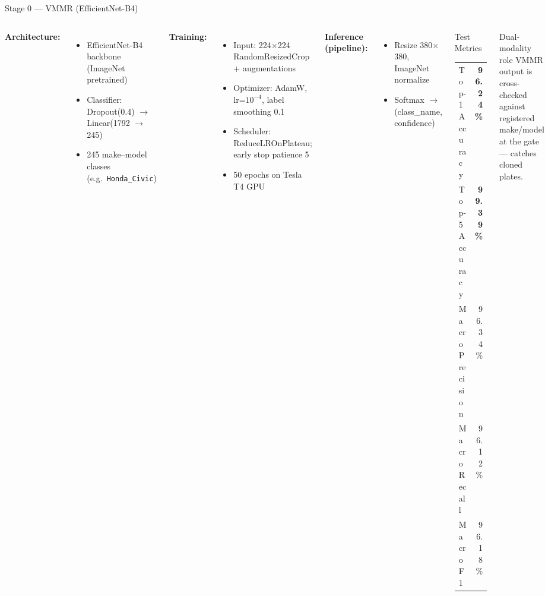 \documentclass[aspectratio=169,11pt]{beamer}
\begin{document}
\begin{frame}{Stage 0 --- VMMR (EfficientNet-B4)}
  \begin{columns}[T]
    \textbf{Architecture:}
    \begin{itemize}
      \item EfficientNet-B4 backbone (ImageNet pretrained)
      \item Classifier: Dropout(0.4) $\rightarrow$ Linear(1792 $\rightarrow$ 245)
      \item 245 make--model classes (e.g.\ \texttt{Honda\_Civic})
    \end{itemize}
    \textbf{Training:}
    \begin{itemize}
      \item Input: 224$\times$224 RandomResizedCrop + augmentations
      \item Optimizer: AdamW, lr=$10^{-4}$, label smoothing 0.1
      \item Scheduler: ReduceLROnPlateau; early stop patience 5
      \item 50 epochs on Tesla T4 GPU
    \end{itemize}
    \textbf{Inference (pipeline):}
    \begin{itemize}
      \item Resize 380$\times$380, ImageNet normalize
      \item Softmax $\rightarrow$ (class\_name, confidence)
    \end{itemize}
    \begin{block}{Test Metrics}
      \begin{tabular}{@{}lr@{}}
        Top-1 Accuracy & \textbf{96.24\%} \\
        Top-5 Accuracy & \textbf{99.39\%} \\
        Macro Precision & 96.34\% \\
        Macro Recall    & 96.12\% \\
        Macro F1        & 96.18\% \\
      \end{tabular}
    \end{block}
    \begin{alertblock}{Dual-modality role}
      VMMR output is cross-checked against registered make/model at the gate --- catches cloned plates.
    \end{alertblock}
  \end{columns}
\end{frame}
\end{document}
